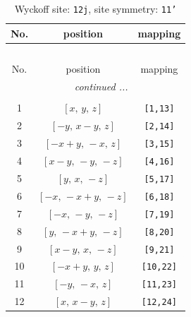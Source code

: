 \documentclass[fleqn,8pt]{jsarticle}
\begin{document}
\begin{longtable}{ccc}
\caption{Wyckoff site: {\tt 12j}, site symmetry: {\tt 11'}}
 \\
 \hline \hline
No. & position & mapping \\ \hline \endfirsthead

\multicolumn{2}{l}{\tablename\ \thetable{}} \\
 \hline \hline
No. & position & mapping \\ \hline \endhead

 \hline \hline
\multicolumn{2}{r}{\footnotesize\it continued ...} \\ \endfoot

 \hline \hline
\multicolumn{2}{r}{} \\ \endlastfoot

1 & $\left[ x,\, y,\, z \right]$ & {\tt [1,13]} \\ \hline
2 & $\left[ - y,\, x - y,\, z \right]$ & {\tt [2,14]} \\ \hline
3 & $\left[ - x + y,\, - x,\, z \right]$ & {\tt [3,15]} \\ \hline
4 & $\left[ x - y,\, - y,\, - z \right]$ & {\tt [4,16]} \\ \hline
5 & $\left[ y,\, x,\, - z \right]$ & {\tt [5,17]} \\ \hline
6 & $\left[ - x,\, - x + y,\, - z \right]$ & {\tt [6,18]} \\ \hline
7 & $\left[ - x,\, - y,\, - z \right]$ & {\tt [7,19]} \\ \hline
8 & $\left[ y,\, - x + y,\, - z \right]$ & {\tt [8,20]} \\ \hline
9 & $\left[ x - y,\, x,\, - z \right]$ & {\tt [9,21]} \\ \hline
10 & $\left[ - x + y,\, y,\, z \right]$ & {\tt [10,22]} \\ \hline
11 & $\left[ - y,\, - x,\, z \right]$ & {\tt [11,23]} \\ \hline
12 & $\left[ x,\, x - y,\, z \right]$ & {\tt [12,24]} \\
\end{longtable}
\end{document}
